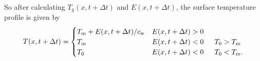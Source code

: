 \documentclass[12pt]{article}
\begin{document}
So after calculating $T_\mathrm{g}(x,t+\Delta t)$ and $E(x,t+\Delta t)$, the surface temperature profile is given by
\begin{equation}\label{eq:surfacetempprofile}
T(x,t+\Delta t) = \begin{cases}
    T_\mathrm{m} + E(x,t+\Delta t)/c_\mathrm{w} & E(x,t+\Delta t)>0 \\
    T_\mathrm{m} & E(x,t+\Delta t)<0 \hspace{1.5em} T_0 > T_\mathrm{m} \\
    T_0 & E(x,t+\Delta t)<0 \hspace{1.5em} T_0 < T_\mathrm{m}. \\
    \end{cases}
\end{equation}
\end{document}
